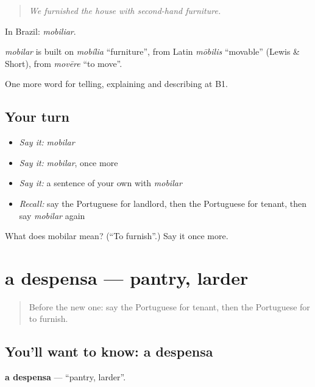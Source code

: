 \begin{quote}
\emph{We furnished the house with second-hand furniture.}
\end{quote}

In Brazil: \emph{mobiliar}.

\begin{cousinweb}
\emph{mobilar} is built on \emph{mobília} \textquotedblleft{}furniture\textquotedblright{}, from Latin \emph{mōbilis} \textquotedblleft{}movable\textquotedblright{} (Lewis \& Short), from \emph{movēre} \textquotedblleft{}to move\textquotedblright{}.
\end{cousinweb}

\begin{grammarlens}[title={What you've built}]
One more word for telling, explaining and describing at B1.
\end{grammarlens}

\subsection*{Your turn}
\begin{itemize}
\raggedright
  \item \emph{Say it:} \emph{mobilar}
  \item \emph{Say it:} \emph{mobilar}, once more
  \item \emph{Say it:} a sentence of your own with \emph{mobilar}
  \item \emph{Recall:} say the Portuguese for landlord, then the Portuguese for tenant, then say \emph{mobilar} again
\end{itemize}

\begin{tcolorbox}[breakable,colback=teal!4,colframe=teal!35!black,title={Before you move on}]
What does mobilar mean? (\textquotedblleft{}To furnish\textquotedblright{}.) Say it once more.
\end{tcolorbox}
\section[a despensa]{a despensa — pantry, larder}

\label{lesson:PT-C530-despensa}



\begin{quote}
Before the new one: say the Portuguese for tenant, then the Portuguese for to furnish.
\end{quote}

\subsection*{You'll want to know: a despensa}
\textbf{a despensa} — \textquotedblleft{}pantry, larder\textquotedblright{}.

